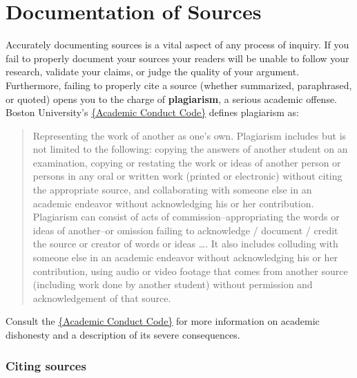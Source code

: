 


\chapter{Documentation of Sources}

Accurately documenting sources is a vital aspect of any process of inquiry. If you fail to 
properly document your sources your readers will be unable to follow your research, 
validate your claims, or judge the quality of your argument. Furthermore, failing to 
properly cite a source (whether summarized, paraphrased, or quoted) opens you to the 
charge of \textbf{plagiarism}, a serious academic offense. 
Boston University's \href{http://www.bu.edu/academics/resources/academic-conduct-code}{\{Academic Conduct Code\}}  defines plagiarism as:

\begin{quote}Representing the work of another as one's own. Plagiarism includes but is 
not limited to the following: copying the answers of another student on an examination,
 copying or restating the work or ideas of another person or persons in any oral or 
written work (printed or electronic) without citing the appropriate source, and 
collaborating with someone else in an academic endeavor without acknowledging his or 
her contribution. Plagiarism can consist of acts of commission--appropriating the words 
or ideas of another--or omission failing to acknowledge / document / credit the source 
or creator of words or ideas \dots. It also includes colluding with someone else in an 
academic endeavor without acknowledging his or her contribution, using audio or video 
footage that comes from another source (including work done by another student) 
without permission and acknowledgement of that source.
\end{quote}
Consult the \href{http://www.bu.edu/academics/resources/academic-conduct-code}{\{Academic Conduct Code\}} 
for more information on academic dishonesty and a description of its severe consequences.


\subsection{Citing sources}

